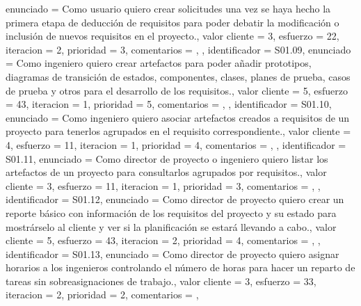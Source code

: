 \documentclass[a4paper, 12pt, spanish]{memoria}
\begin{document}
{{    enunciado     = {Como usuario quiero crear solicitudes una vez se haya hecho la primera etapa de deducción de requisitos para poder debatir la modificación o inclusión de nuevos requisitos en el proyecto.},
    valor cliente = 3,
    esfuerzo      = {2}{2},
    iteracion     = 2,
    prioridad     = 3,
    comentarios   = {},
},{%
    identificador = S01.09,
    enunciado     = {Como ingeniero quiero crear artefactos para poder añadir prototipos, diagramas de transición de estados, componentes, clases, planes de prueba, casos de prueba y otros para el desarrollo de los requisitos.},
    valor cliente = 5,
    esfuerzo      = {4}{3},
    iteracion     = 1,
    prioridad     = 5,
    comentarios   = {},
},{%
    identificador = S01.10,
    enunciado     = {Como ingeniero quiero asociar artefactos creados a requisitos de un proyecto para tenerlos agrupados en el requisito correspondiente.},
    valor cliente = 4,
    esfuerzo      = {1}{1},
    iteracion     = 1,
    prioridad     = 4,
    comentarios   = {},
},{%
    identificador = S01.11,
    enunciado     = {Como director de proyecto o ingeniero quiero listar los artefactos de un proyecto para consultarlos agrupados por requisitos.},
    valor cliente = 3,
    esfuerzo      = {1}{1},
    iteracion     = 1,
    prioridad     = 3,
    comentarios   = {},
},{%
    identificador = S01.12,
    enunciado     = {Como director de proyecto quiero crear un reporte básico con información de los requisitos del proyecto y su estado para mostrárselo al cliente y ver si la planificación se estará llevando a cabo.},
    valor cliente = 5,
    esfuerzo      = {4}{3},
    iteracion     = 2,
    prioridad     = 4,
    comentarios   = {},
},{%
    identificador = S01.13,
    enunciado     = {Como director de proyecto quiero asignar horarios a los ingenieros controlando el número de horas para hacer un reparto de tareas sin sobreasignaciones de trabajo.},
    valor cliente = 3,
    esfuerzo      = {3}{3},
    iteracion     = 2,
    prioridad     = 2,
    comentarios   = {},
}} %
\end{document}

